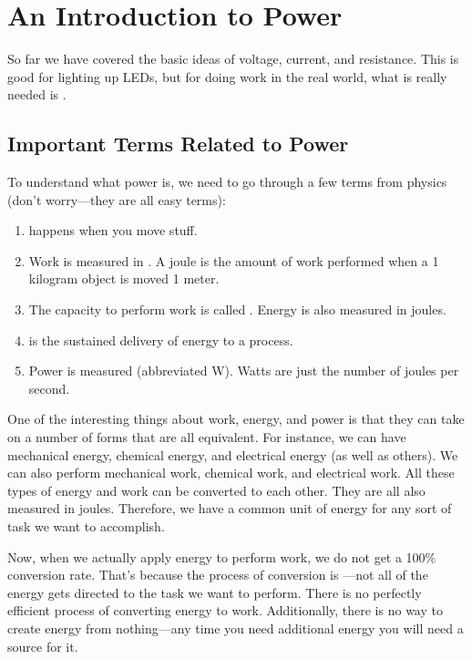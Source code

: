 \chapter{An Introduction to Power}

So far we have covered the basic ideas of voltage, current, and resistance.
This is good for lighting up LEDs, but for doing work in the real world, what is really needed is .

\section{Important Terms Related to Power}

To understand what power is, we need to go through a few terms from physics (don't worry---they are all easy terms):

\begin{enumerate}
\item {} happens when you move stuff.  
\item Work is measured in . A joule is the amount of work performed when a 1 kilogram object is moved 1 meter.
\item The capacity to perform work is called .  Energy is also measured in joules.
\item {} is the sustained delivery of energy to a process.  
\item Power is measured  (abbreviated W).  Watts are just the number of joules per second.
\end{enumerate}

One of the interesting things about work, energy, and power is that they can take on a number of forms that are all equivalent.
For instance, we can have mechanical energy, chemical energy, and electrical energy (as well as others).
We can also perform mechanical work, chemical work, and electrical work.
All these types of energy and work can be converted to each other.
They are all also measured in joules.
Therefore, we have a common unit of energy for any sort of task we want to accomplish.

Now, when we actually apply energy to perform work, we do not get a 100\% conversion rate.
That's because the process of conversion is ---not all of the energy gets directed to the task we want to perform.
There is no perfectly efficient process of converting energy to work.
Additionally, there is no way to create energy from nothing---any time you need additional energy you will need a source for it.

